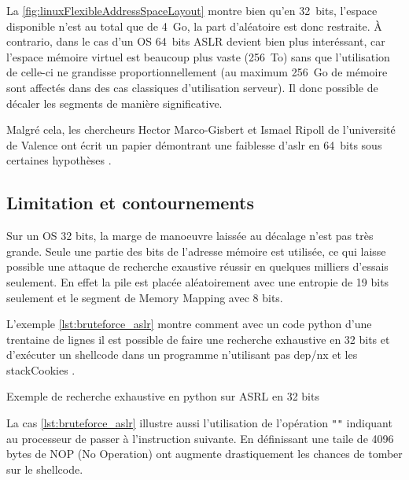 La \autoref{fig:linuxFlexibleAddressSpaceLayout} montre bien qu'en 32~bits, l'espace disponible n'est au total que de 4~Go, la part d'aléatoire est donc restraite. À contrario, dans le cas d'un OS 64~bits ASLR devient bien plus interéssant, car l'espace mémoire virtuel est beaucoup plus vaste (256~To) sans que l'utilisation de celle-ci ne grandisse proportionnellement (au maximum 256~Go de mémoire sont affectés dans des cas classiques d'utilisation serveur). Il donc possible de décaler les segments de manière significative.

Malgré cela, les chercheurs Hector Marco-Gisbert et Ismael Ripoll de l'université de Valence ont écrit un papier démontrant une faiblesse d'\gls{aslr} en 64~bits sous certaines hypothèses \cite{EffectivenessFullASLR64bit}.

\vfill

\subsection{Limitation et contournements}

Sur un OS 32 bits, la marge de manoeuvre laissée au décalage n'est pas très grande. Seule une partie des bits de l'adresse mémoire est utilisée, ce qui laisse possible une attaque de recherche exaustive réussir en quelques milliers d'essais seulement. En effet la pile est placée aléatoirement avec une entropie de 19 bits seulement et le segment de Memory Mapping avec 8 bits.

L'exemple \autoref{lst:bruteforce_aslr} montre comment avec un code python d'une trentaine de lignes il est possible de faire une recherche exhaustive en 32 bits et d'exécuter un shellcode dans un programme n'utilisant pas \gls{dep}/\gls{nx} et les \gls{stackCookies} .

\newpage

\begin{listing}
	\caption{Exemple de recherche exhaustive en python sur ASRL en 32 bits}
	\label{lst:bruteforce_aslr}
\end{listing}

La cas \autoref{lst:bruteforce_aslr} illustre aussi l'utilisation de l'opération \texttt{""} indiquant au processeur de passer à l'instruction suivante. En définissant une taile de 4096 bytes de NOP (No Operation) ont augmente drastiquement les chances de tomber sur le shellcode.


